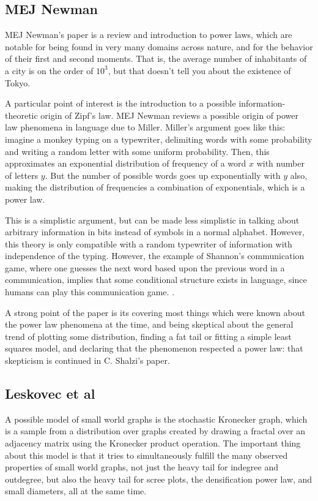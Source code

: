 \documentclass[12pt]{article}
\begin{document}
\subsection{MEJ Newman}

MEJ Newman's paper is a review and introduction to power laws, which are notable for being found in very many domains across nature, and for the behavior of their first and second moments. That is, the average number of inhabitants of a city is on the order of $10^3$, but that doesn't tell you about the existence of Tokyo.

A particular point of interest is the introduction to a possible information-theoretic origin of Zipf's law. MEJ Newman reviews a possible origin of power law phenomena in language due to Miller\cite{gamiller}. Miller's argument goes like this: imagine a monkey typing on a typewriter, delimiting words with some probability and writing a random letter with some uniform probability. Then, this approximates an exponential distribution of frequency of a word $x$ with number of letters $y$. But the number of possible words goes up exponentially with $y$ also, making the distribution of frequencies a combination of exponentials, which is a power law.

This is a simplistic argument, but can be made less simplistic in talking about arbitrary information in bits instead of symbols in a normal alphabet. However, this theory is only compatible with a random typewriter of information with independence of the typing. However, the example of Shannon's communication game, where one guesses the next word based upon the previous word in a communication, implies that some conditional structure exists in language, since humans can play this communication game. %
. 

A strong point of the paper is its covering most things which were known about the power law phenomena at the time, and being skeptical about the general trend of plotting some distribution, finding a fat tail or fitting a simple least squares model, and declaring that the phenomenon respected a power law: that skepticism is continued in C. Shalzi's paper\cite{cosma}.

\subsection{Leskovec et al}

A possible model of small world graphs is the stochastic Kronecker graph\cite{kronfit}, which is a sample from a distribution over graphs created by drawing a fractal over an adjacency matrix using the Kronecker product operation. The important thing about this model is that it tries to simultaneously fulfill the many observed properties of small world graphs, not just the heavy tail for indegree and outdegree, but also the heavy tail for scree plots, the densification power law, and small diameters, all at the same time.
\end{document}
